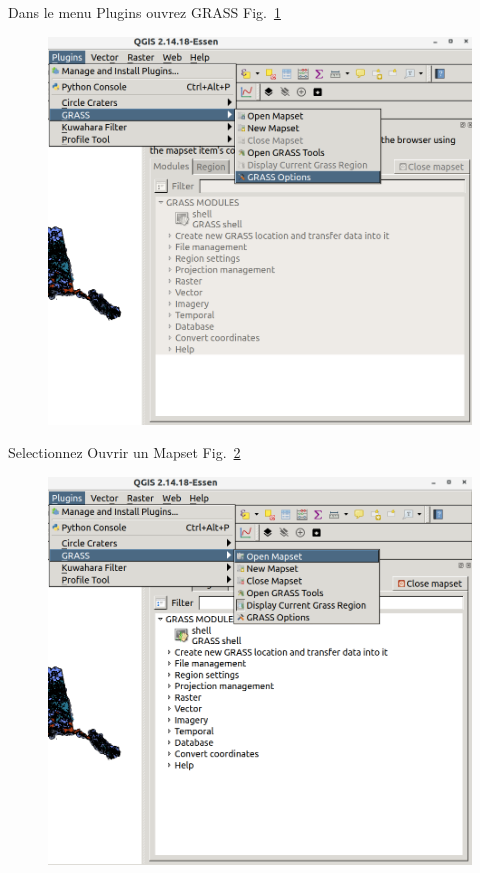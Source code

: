 Dans le menu Plugins ouvrez GRASS Fig.~\ref{fig:qgis012}

\begin{figure}[htbp]
   \centering
   \includegraphics[scale=0.2]{qgis012.png}
   \caption{}
   \label{fig:qgis012}
\end{figure}


Selectionnez Ouvrir un Mapset Fig.~\ref{fig:qgis013}

\begin{figure}[htbp]
   \centering
   \includegraphics[scale=0.2]{qgis013.png}
   \caption{}
   \label{fig:qgis013}
\end{figure}

